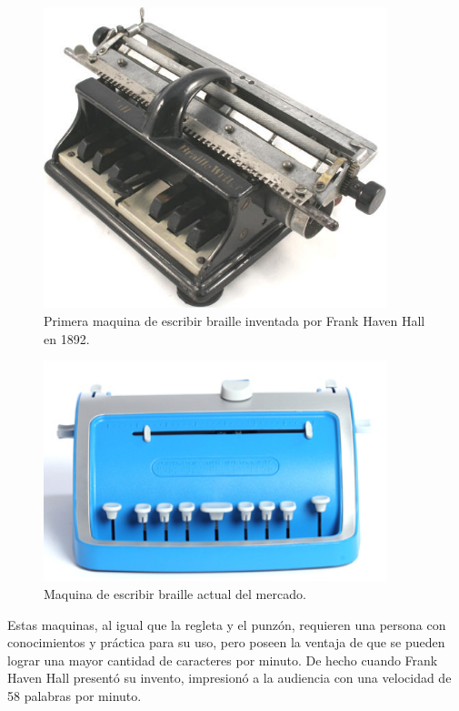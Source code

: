\begin{figure}[htp]
\centering
\includegraphics[width=10cm]{./img/hallbraille-03.png}
\caption{Primera maquina de escribir braille inventada por Frank Haven Hall
en 1892.}
\label{fig:hallbraille-03}
\end{figure}



\begin{figure}[htp]
\centering
\includegraphics[width=10cm]{./img/ng_perkinsaph_brailler.png}
\caption{Maquina de escribir braille actual del mercado.}
\label{fig:ng_perkinsaph_brailler}
\end{figure}

Estas maquinas, al igual que la regleta y el punz\'on, requieren una persona
con conocimientos y pr\'actica para su uso, pero poseen la ventaja de que se
pueden lograr una mayor cantidad de caracteres por minuto. De hecho cuando
Frank Haven Hall present\'o su invento, impresion\'o a la audiencia con una
velocidad de 58 palabras por minuto.



